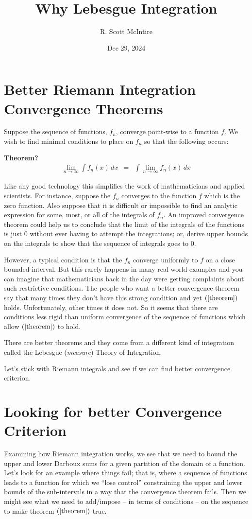 \documentclass{article}
\title{Why Lebesgue Integration}
\author{R. Scott McIntire}
\date{Dec 29, 2024}
\begin{document}
\maketitle


\section{Better Riemann Integration Convergence Theorems}
Suppose the sequence of functions, $f_n$, converge point-wise to a function $f$.
We wish to find minimal conditions to place on $f_n$ so that the following occurs:

{\bf Theorem?}
\begin{eqnarray}
	\lim_{n \rightarrow \infty}\limits \int f_n(x) \, dx & = & \int \lim_{n \rightarrow \infty}\limits f_n(x) \, dx \label{theorem}
\end{eqnarray}

Like any good technology this simplifies the work of mathematicians 
and applied scientists. For instance, suppose the $f_n$ converges to the function $f$ 
which is the zero function. Also suppose that it is difficult or impossible to 
find an analytic expression for some, most, or all of the integrals of $f_n$. 
An improved convergence theorem could help us to conclude that the limit of the integrals of 
the functions is just $0$ without ever having to attempt the integrations; or, 
derive upper bounds on the integrals to show that 
the sequence of integrals goes to $0$.

However, a typical condition is that the $f_n$ converge 
uniformly to $f$ on a close bounded interval. 
But this rarely happens in many real world examples and you can imagine that
mathematicians back in the day
were getting complaints about such restrictive 
conditions. The people who want a better convergence theorem say that many 
times they don't have this strong condition and yet $(\ref{theorem})$
holds. Unfortunately, other times it does not. So it seems that there are 
conditions less rigid than uniform convergence of the sequence of 
functions which allow $(\ref{theorem})$ to hold.

There are better theorems and they come from a different kind of integration called 
the Lebesgue ({\em measure\/}) Theory of Integration.

Let's stick with Riemann integrals and see if we can find better convergence 
criterion.

\section{Looking for better Convergence Criterion}
Examining how Riemann integration works, we see that we need to bound the upper 
and lower Darboux sums for a given partition of the domain of a function. 
Let's look for an example where things fail; that is, where 
a sequence of functions leads to a function for which we ``lose control'' 
constraining the upper and lower bounds of the sub-intervals in a way that the 
convergence theorem fails. Then we might see what we need to add/impose 
-- in terms of conditions -- on the sequence to make theorem 
$(\ref{theorem})$ true.
\end{document}
